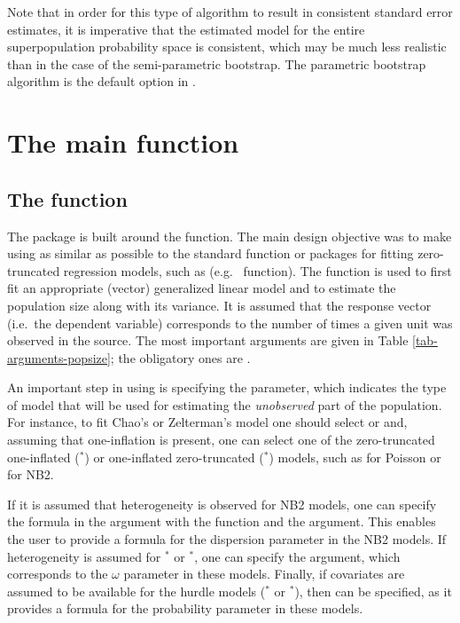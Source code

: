 \documentclass[
]{jss}
\newcommand{\1}{\mathcal{I}} \newcommand{\bZero}{\boldsymbol{0}}
\begin{document}
Note that in order for this type of algorithm to result in consistent
standard error estimates, it is imperative that the estimated model for
the entire superpopulation probability space is consistent, which may be
much less realistic than in the case of the semi-parametric bootstrap.
The parametric bootstrap algorithm is the default option in
.

\newpage

\section{The main function}\label{sec-main}

\subsection[The estimatePopsize function]{The  function}

The  package is built around the
 function. The main design objective was to make
using  as similar as possible to the standard
 function or packages for fitting zero-truncated
regression models, such as 
(e.g.~ function). The 
function is used to first fit an appropriate (vector) generalized linear
model and to estimate the population size along with its variance. It is
assumed that the response vector (i.e.~the dependent variable)
corresponds to the number of times a given unit was observed in the
source. The most important arguments are given in Table
\ref{tab-arguments-popsize}; the obligatory ones are
.

An important step in using  is specifying the
 parameter, which indicates the type of model that will be
used for estimating the \emph{unobserved} part of the population. For
instance, to fit Chao's or Zelterman's model one should select
 or  and, assuming that one-inflation is
present, one can select one of the zero-truncated one-inflated
(\(^\ast\)) or one-inflated zero-truncated
(\(^\ast\)) models, such as  for Poisson or
 for NB2.

If it is assumed that heterogeneity is observed for NB2 models, one can
specify the formula in the  argument with the
 function and the  argument. This
enables the user to provide a formula for the dispersion parameter in
the NB2 models. If heterogeneity is assumed for \(^\ast\) or
\(^\ast\), one can specify the  argument,
which corresponds to the \(\omega\) parameter in these models. Finally,
if covariates are assumed to be available for the hurdle models
(\(^\ast\) or \(^\ast\)), then
 can be specified, as it provides a formula for the
probability parameter in these models.
\end{document}

